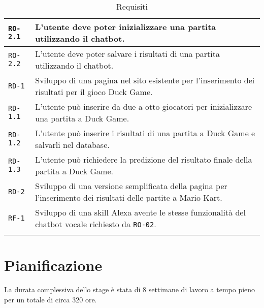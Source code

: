 \begin{center}
\begin{longtable}{| C{3cm} | L{8.7cm} |}
		\hline 
		
		\texttt{RO-2.1} & L'utente deve poter inizializzare una partita utilizzando il \gls{chatbot}. \\
		
		\hline 
		
		\texttt{RO-2.2} & L'utente deve poter salvare i risultati di una partita utilizzando il \gls{chatbot}. \\
		
		\hline
		
		\texttt{RD-1} & Sviluppo di una pagina nel sito esistente per l'inserimento dei risultati per il gioco Duck Game. \\
			
		\hline 
		
		\texttt{RD-1.1} & L'utente può inserire da due a otto giocatori per inizializzare una partita a Duck Game. \\
		
		\hline 
		
		\texttt{RD-1.2} & L'utente può inserire i risultati di una partita a Duck Game e salvarli nel database. \\
		
		\hline 
		
		\texttt{RD-1.3} & L'utente può richiedere la predizione del risultato finale della partita a Duck Game. \\	
			
		\hline 
		
		\texttt{RD-2} & Sviluppo di una versione semplificata della pagina per l'inserimento dei risultati delle 
		partite a Mario Kart. \\
		
		\hline 
		
		\texttt{RF-1} & Sviluppo di una \gls{skill} Alexa avente le stesse funzionalità del \gls{chatbot} vocale 
		richiesto da \texttt{RO-02}. \\
		
		\hline 
		
		\caption{Requisiti}\label{tab:requisiti}
	\end{longtable}
	
	
\end{center}

\section{Pianificazione}
La durata complessiva dello stage è stata di 8 settimane di lavoro a tempo pieno per un totale di circa 320 ore. \\

